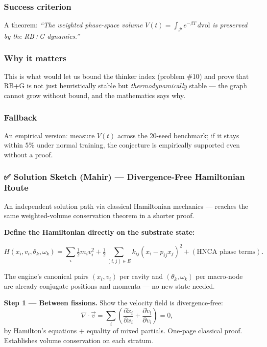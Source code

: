 \documentclass[
  11pt,
  a4paper,
]{article}
\begin{document}
\subsubsection{Success criterion}\label{success-criterion-7}

A theorem: \emph{``The weighted phase-space volume
\(V(t) = \int_{\mathcal{P}} e^{-\beta T} \, d\text{vol}\) is preserved
by the RB+G dynamics.''}

\subsubsection{Why it matters}\label{why-it-matters}

This is what would let us bound the thinker index (problem \#10) and
prove that RB+G is not just heuristically stable but
\emph{thermodynamically} stable --- the graph cannot grow without bound,
and the mathematics says why.

\subsubsection{Fallback}\label{fallback-2}

An empirical version: measure \(V(t)\) across the 20-seed benchmark; if
it stays within 5\% under normal training, the conjecture is empirically
supported even without a proof.

\subsubsection{✅ Solution Sketch (Mahir) --- Divergence-Free
Hamiltonian
Route}\label{solution-sketch-mahir-divergence-free-hamiltonian-route}

An independent solution path via classical Hamiltonian mechanics ---
reaches the same weighted-volume conservation theorem in a shorter
proof.

\textbf{Define the Hamiltonian directly on the substrate state:}

\[
H(x_i, v_i, \theta_k, \omega_k) = \sum_i \tfrac{1}{2} m_i v_i^2
                                + \tfrac{1}{2} \sum_{(i,j) \in E} k_{ij} (x_i - p_{ij} x_j)^2
                                + (\text{HNCA phase terms}).
\]

The engine's canonical pairs \((x_i, v_i)\) per cavity and
\((\theta_k, \omega_k)\) per macro-node are already conjugate positions
and momenta --- no new state needed.

\textbf{Step 1 --- Between fissions.} Show the velocity field is
divergence-free: \[
\nabla \cdot \vec{v} = \sum_i\left(\frac{\partial \dot{x}_i}{\partial x_i} + \frac{\partial \dot{v}_i}{\partial v_i}\right) = 0,
\] by Hamilton's equations + equality of mixed partials. One-page
classical proof. Establishes volume conservation on each stratum.
\end{document}

